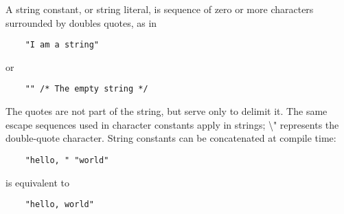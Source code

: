 A string constant, or string literal, is sequence of zero or more
characters surrounded by doubles quotes, as in
\begin{lstlisting}
    "I am a string"
\end{lstlisting}
or
\begin{lstlisting}
    "" /* The empty string */
\end{lstlisting}
The quotes are not part of the string, but serve only to delimit it. The
same escape sequences used in character constants apply in strings;
\textbackslash " represents the double-quote character. String constants
can be concatenated at compile time:
\begin{lstlisting}
    "hello, " "world"
\end{lstlisting}
is equivalent to
\begin{lstlisting}
    "hello, world"
\end{lstlisting}
